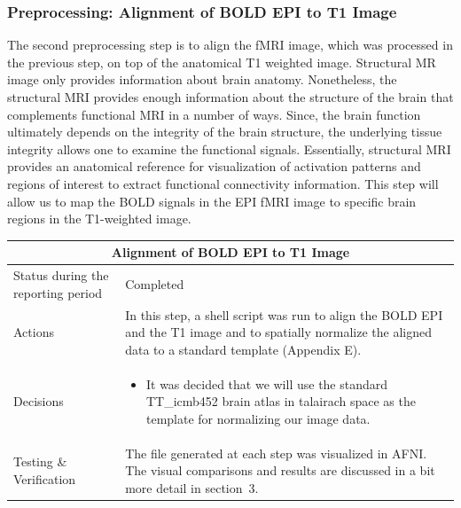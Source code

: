 \documentclass[12pt]{article}
\begin{document}
\subsubsection{Preprocessing: Alignment of BOLD EPI to T1 Image}%
\label{sub:}

The second preprocessing step is to align the fMRI image, which was
processed in the previous step, on top of the anatomical T1 weighted
image. Structural MR image only provides information about brain
anatomy. Nonetheless, the structural MRI provides enough information
about the structure of the brain that complements functional MRI in a
number of ways. Since, the brain function ultimately depends on the
integrity of the brain structure, the underlying tissue integrity
allows one to examine the functional signals. Essentially, structural
MRI provides an anatomical reference for visualization of activation
patterns and regions of interest to extract functional connectivity
information. This step will allow us to map the BOLD signals in the
EPI fMRI image to specific brain regions in the T1-weighted image.

\begin{table}[H]
  \centering
  \begin{tabular} {| m{3.3cm} | m{11.5cm} | }
    \hline
    \multicolumn{2}{|c|}{Alignment of BOLD EPI to T1 Image } \\ \hline
    Status during the reporting period & Completed    \\ \hline
    Actions &
    In this step, a shell script was run to align the BOLD EPI and the
    T1 image and to spatially normalize the aligned data to a standard
    template (Appendix E). \\ \hline

    Decisions &
    \begin{itemize}

      \item It was decided that we will use the standard TT\_icmb452
        brain atlas in talairach space as the template for normalizing
        our image data.

    \end{itemize} \\ \hline

    Testing \& Verification &
    The file generated at each step was visualized in AFNI. The
    visual comparisons and results are discussed in a bit more detail
    in section~3. \\ \hline

  \end{tabular}
\end{table}
\end{document}
